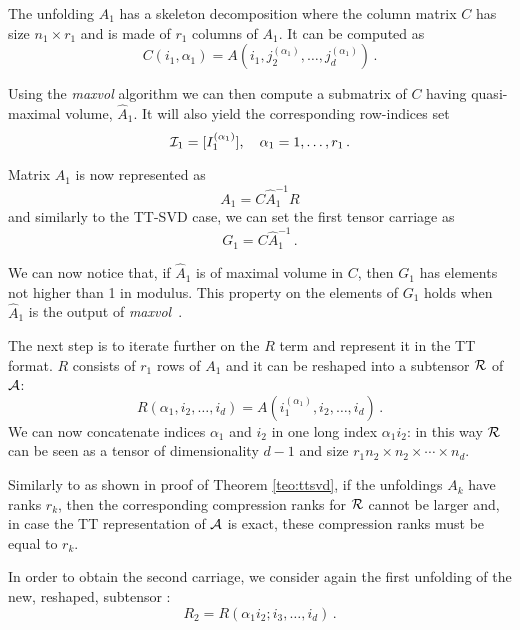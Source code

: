The unfolding $A_1$ has a skeleton decomposition where the column matrix $C$ has size $n_1 \times r_1$ and is made of $r_1$ columns of $A_1$.
It can be computed as
\begin{equation*}
  C(i_1,\alpha_1) = A(i_1,j_2^{(\alpha_1)},\ldots,j_d^{(\alpha_1)})\, .
\end{equation*}

Using the \emph{maxvol} algorithm we can then compute a submatrix of $C$ having quasi-maximal volume, $\hat{A}_1$. It will also yield the corresponding row-indices set
\begin{equation*}
  \mathcal{I}_1 = [I_1^{(\alpha_1)}], \quad \alpha_1 = 1,\ldots,r_1\, .
\end{equation*}

Matrix $A_1$ is now represented as
\begin{equation*}
  A_1 = C\hat{A}_1^{-1}R
\end{equation*}
and similarly to the TT-SVD case, we can set the first tensor carriage as
\begin{equation*}
  G_1 = C\hat{A}_1^{-1}\, .
\end{equation*}

We can now notice that, if $\hat{A}_1$ is of maximal volume in $C$, then $G_1$ has elements not higher than 1 in modulus. This property on the elements of $G_1$ holds when $\hat{A}_1$ is the output of \emph{maxvol}~\cite{tyrtyshnikov2000incomplete,goreinov2010find}.

The next step is to iterate further on the $R$ term and represent it in the TT format. $R$ consists of $r_1$ rows of $A_1$ and it can be reshaped into a subtensor $\mathcal{R}$ of $\mathcal{A}$:
\begin{equation*}
  R(\alpha_1,i_2,\ldots,i_d) = A(i_1^{(\alpha_1)},i_2,\ldots,i_d)\, .
\end{equation*}
We can now concatenate indices $\alpha_1$ and $i_2$ in one long index $\alpha_1i_2$: in this way $\mathcal{R}$ can be seen as a tensor of dimensionality $d-1$ and size $r_1n_2 \times n_2 \times \cdots \times n_d$.

Similarly to as shown in proof of Theorem \ref{teo:ttsvd}, if the unfoldings $A_k$ have ranks $r_k$, then the corresponding compression ranks for $\mathcal{R}$ cannot be larger and, in case the TT representation of $\mathcal{A}$ is exact, these compression ranks must be equal to $r_k$.

In order to obtain the second carriage, we consider again the first unfolding of the new, reshaped, subtensor :
\begin{equation*}
  R_2 = R(\alpha_1i_2;i_3,\ldots,i_d)\, .
\end{equation*}

